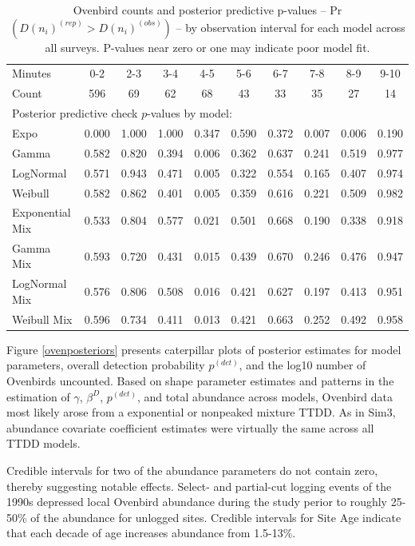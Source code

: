 \documentclass[useAMS,usenatbib,referee,12pt]{article}
\begin{document}
\begin{table}[ht]
\centering
\begin{tabular}{lccccccccc}
  \hline
Minutes & 0-2 & 2-3 & 3-4 & 4-5 & 5-6 & 6-7 & 7-8 & 8-9 & 9-10 \\ 
Count & 596 & 69 & 62 & 68 & 43 & 33 & 35 & 27 & 14 \\ 
\hline
\multicolumn{10}{l}{Posterior predictive check $p$-values by model:}\\
\hline
Expo & 0.000 & 1.000 & 1.000 & 0.347 & 0.590 & 0.372 & 0.007 & 0.006 & 0.190 \\ 
  Gamma & 0.582 & 0.820 & 0.394 & 0.006 & 0.362 & 0.637 & 0.241 & 0.519 & 0.977 \\ 
  LogNormal & 0.571 & 0.943 & 0.471 & 0.005 & 0.322 & 0.554 & 0.165 & 0.407 & 0.974 \\ 
  Weibull & 0.582 & 0.862 & 0.401 & 0.005 & 0.359 & 0.616 & 0.221 & 0.509 & 0.982 \\ 
\hline
  Exponential Mix & 0.533 & 0.804 & 0.577 & 0.021 & 0.501 & 0.668 & 0.190 & 0.338 & 0.918 \\ 
  Gamma Mix & 0.593 & 0.720 & 0.431 & 0.015 & 0.439 & 0.670 & 0.246 & 0.476 & 0.947 \\ 
  LogNormal Mix & 0.576 & 0.806 & 0.508 & 0.016 & 0.421 & 0.627 & 0.197 & 0.413 & 0.951 \\ 
  Weibull Mix & 0.596 & 0.734 & 0.411 & 0.013 & 0.421 & 0.663 & 0.252 & 0.492 & 0.958 \\ 
   \hline
\end{tabular}
\caption{\label{tbl:ovencounts} Ovenbird counts and posterior predictive p-values -- Pr$\left(D(n_i)^{(rep)} > D(n_i)^{(obs)}\right)$ -- by observation interval for each model across all surveys.  P-values near zero or one may indicate poor model fit.}
\end{table}

Figure \ref{ovenposteriors} presents caterpillar plots of posterior estimates for model parameters, overall detection probability $p^{(det)}$, and the log10 number of Ovenbirds uncounted.  
Based on shape parameter estimates and patterns in the estimation of $\gamma$, $\beta^D$, $p^{(det)}$, and total abundance across models, Ovenbird data most likely arose from a exponential or nonpeaked mixture TTDD.
As in Sim3, abundance covariate coefficient estimates were virtually the same across all TTDD models.  

Credible intervals for two of the abundance parameters do not contain zero, thereby suggesting notable effects.  
Select- and partial-cut logging events of the 1990s depressed local Ovenbird abundance during the study perior to roughly 25-50\% of the abundance for unlogged sites.  
Credible intervals for Site Age indicate that each decade of age increases abundance from 1.5-13\%.
\end{document}
